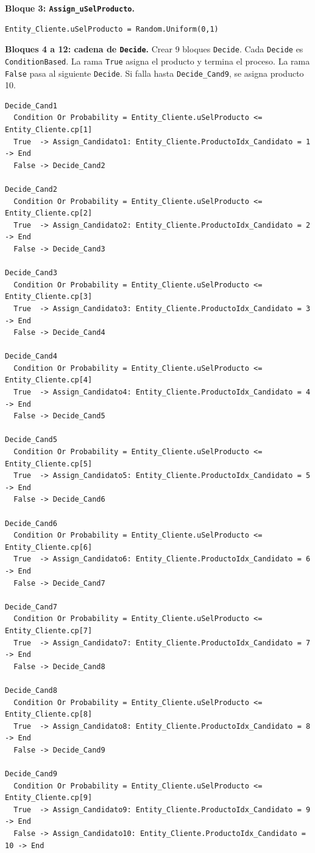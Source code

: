 \documentclass[11pt]{article}
\newcommand{\simio}[1]{\texttt{#1}}
\begin{document}
\textbf{Bloque 3: \simio{Assign\_uSelProducto}.}

\begin{lstlisting}[caption={Assign uSelProducto}]
Entity_Cliente.uSelProducto = Random.Uniform(0,1)
\end{lstlisting}

\textbf{Bloques 4 a 12: cadena de \simio{Decide}.} Crear 9 bloques \simio{Decide}. Cada \simio{Decide} es \simio{ConditionBased}. La rama \simio{True} asigna el producto y termina el proceso. La rama \simio{False} pasa al siguiente \simio{Decide}. Si falla hasta \simio{Decide\_Cand9}, se asigna producto 10.

\begin{lstlisting}[caption={Decides de P M6 MuestrearProductoPorHora}]
Decide_Cand1
  Condition Or Probability = Entity_Cliente.uSelProducto <= Entity_Cliente.cp[1]
  True  -> Assign_Candidato1: Entity_Cliente.ProductoIdx_Candidato = 1 -> End
  False -> Decide_Cand2

Decide_Cand2
  Condition Or Probability = Entity_Cliente.uSelProducto <= Entity_Cliente.cp[2]
  True  -> Assign_Candidato2: Entity_Cliente.ProductoIdx_Candidato = 2 -> End
  False -> Decide_Cand3

Decide_Cand3
  Condition Or Probability = Entity_Cliente.uSelProducto <= Entity_Cliente.cp[3]
  True  -> Assign_Candidato3: Entity_Cliente.ProductoIdx_Candidato = 3 -> End
  False -> Decide_Cand4

Decide_Cand4
  Condition Or Probability = Entity_Cliente.uSelProducto <= Entity_Cliente.cp[4]
  True  -> Assign_Candidato4: Entity_Cliente.ProductoIdx_Candidato = 4 -> End
  False -> Decide_Cand5

Decide_Cand5
  Condition Or Probability = Entity_Cliente.uSelProducto <= Entity_Cliente.cp[5]
  True  -> Assign_Candidato5: Entity_Cliente.ProductoIdx_Candidato = 5 -> End
  False -> Decide_Cand6

Decide_Cand6
  Condition Or Probability = Entity_Cliente.uSelProducto <= Entity_Cliente.cp[6]
  True  -> Assign_Candidato6: Entity_Cliente.ProductoIdx_Candidato = 6 -> End
  False -> Decide_Cand7

Decide_Cand7
  Condition Or Probability = Entity_Cliente.uSelProducto <= Entity_Cliente.cp[7]
  True  -> Assign_Candidato7: Entity_Cliente.ProductoIdx_Candidato = 7 -> End
  False -> Decide_Cand8

Decide_Cand8
  Condition Or Probability = Entity_Cliente.uSelProducto <= Entity_Cliente.cp[8]
  True  -> Assign_Candidato8: Entity_Cliente.ProductoIdx_Candidato = 8 -> End
  False -> Decide_Cand9

Decide_Cand9
  Condition Or Probability = Entity_Cliente.uSelProducto <= Entity_Cliente.cp[9]
  True  -> Assign_Candidato9: Entity_Cliente.ProductoIdx_Candidato = 9 -> End
  False -> Assign_Candidato10: Entity_Cliente.ProductoIdx_Candidato = 10 -> End
\end{lstlisting}
\end{document}
